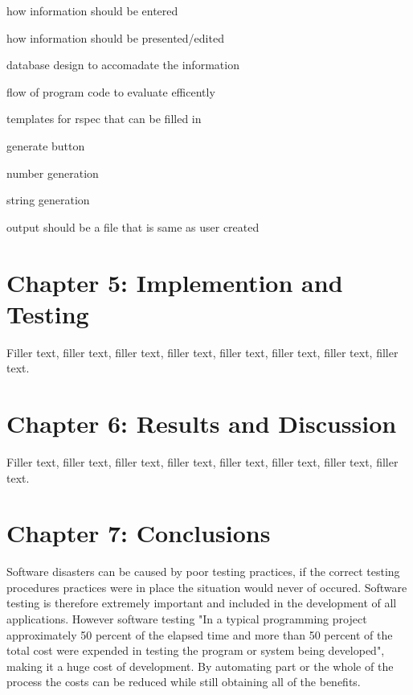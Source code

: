 \documentclass{article}
\begin{document}
\par how information should be entered

\par how information should be presented/edited

\par database design to accomadate the information

\par flow of program code to evaluate efficently

\par templates for rspec that can be filled in

\par generate button

\par number generation

\par string generation

\par output should be a file that is same as user created






\section{Chapter 5: Implemention and Testing}
Filler text, filler text, filler text, filler text, filler text, filler text, filler text, filler text.
\section{Chapter 6: Results and Discussion}
Filler text, filler text, filler text, filler text, filler text, filler text, filler text, filler text.
\section{Chapter 7: Conclusions}

\par Software disasters can be caused by poor testing practices,\cite{mcquaid2012software} if the correct testing procedures practices were in place the situation would never of occured. Software testing is therefore extremely important and included in the development of all applications. However software testing "In a typical programming project approximately 50 percent of the elapsed time and more than 50 percent of the total cost were expended in testing the program or system being developed"\cite{myers2011art}, making it a huge cost of development. By automating part or the whole of the process the costs can be reduced while still obtaining all of the benefits.
\end{document}
